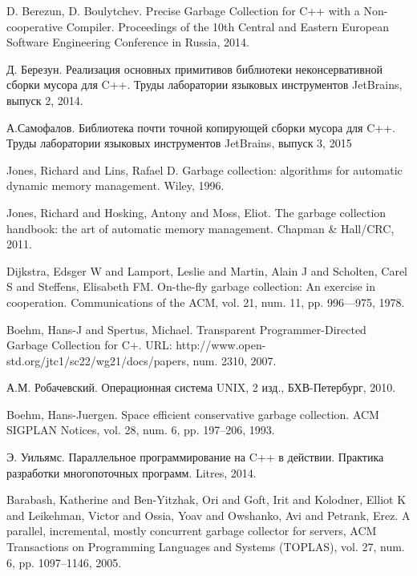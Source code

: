 \begin{thebibliography}{99}

    D. Berezun, D. Boulytchev.
    Precise Garbage Collection for C++ with a Non-cooperative Compiler.
    Proceedings of the 10th Central and Eastern European Software Engineering Conference 
    in Russia, 2014.

    Д. Березун.
    Реализация основных примитивов библиотеки неконсервативной сборки мусора для C++.
    Труды лаборатории языковых инструментов JetBrains, выпуск 2, 2014.

    А.Самофалов.
    Библиотека почти точной копирующей сборки мусора для C++.
    Труды лаборатории языковых инструментов JetBrains, выпуск 3, 2015

    Jones, Richard and Lins, Rafael D.
    Garbage collection: algorithms for automatic dynamic memory management.
    Wiley, 1996.

    Jones, Richard and Hosking, Antony and Moss, Eliot.
    The garbage collection handbook: the art of automatic memory management.
    Chapman \& Hall/CRC, 2011.

    Dijkstra, Edsger W and Lamport, Leslie and Martin, Alain J and Scholten, Carel S and 
    Steffens, Elisabeth FM.
    On-the-fly garbage collection: An exercise in cooperation.
    Communications of the ACM, vol. 21, num. 11, pp. 996---975, 1978.

    Boehm, Hans-J and Spertus, Michael.
    Transparent Programmer-Directed Garbage Collection for C+.
    URL: http://www.open-std.org/jtc1/sc22/wg21/docs/papers,
    num. 2310, 2007.

    А.М. Робачевский.
    Операционная система UNIX, 2 изд.,
    БХВ-Петербург, 2010.

    Boehm, Hans-Juergen. 
    Space efficient conservative garbage collection.
    ACM SIGPLAN Notices, vol. 28, num. 6, pp. 197--206,
    1993.

    Э. Уильямс.
    Параллельное программирование на C++ в действии. Практика разработки многопоточных программ.
    Litres, 2014.

    Barabash, Katherine and Ben-Yitzhak, Ori and Goft, Irit and Kolodner, Elliot K and 
    Leikehman, Victor and Ossia, Yoav and Owshanko, Avi and Petrank, Erez.
    A parallel, incremental, mostly concurrent garbage collector for servers,
    ACM Transactions on Programming Languages and Systems (TOPLAS),  vol. 27,
    num. 6, pp. 1097--1146, 2005.

\end{thebibliography}
